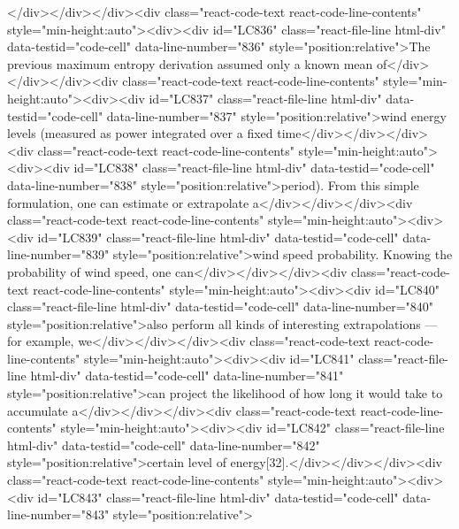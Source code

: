 {{{{{</div></div></div><div class="react-code-text react-code-line-contents" style="min-height:auto"><div><div id="LC836" class="react-file-line html-div" data-testid="code-cell" data-line-number="836" style="position:relative">The previous maximum entropy derivation assumed only a known mean of</div></div></div><div class="react-code-text react-code-line-contents" style="min-height:auto"><div><div id="LC837" class="react-file-line html-div" data-testid="code-cell" data-line-number="837" style="position:relative">wind energy levels (measured as power integrated over a fixed time</div></div></div><div class="react-code-text react-code-line-contents" style="min-height:auto"><div><div id="LC838" class="react-file-line html-div" data-testid="code-cell" data-line-number="838" style="position:relative">period). From this simple formulation, one can estimate or extrapolate a</div></div></div><div class="react-code-text react-code-line-contents" style="min-height:auto"><div><div id="LC839" class="react-file-line html-div" data-testid="code-cell" data-line-number="839" style="position:relative">wind speed probability. Knowing the probability of wind speed, one can</div></div></div><div class="react-code-text react-code-line-contents" style="min-height:auto"><div><div id="LC840" class="react-file-line html-div" data-testid="code-cell" data-line-number="840" style="position:relative">also perform all kinds of interesting extrapolations --- for example, we</div></div></div><div class="react-code-text react-code-line-contents" style="min-height:auto"><div><div id="LC841" class="react-file-line html-div" data-testid="code-cell" data-line-number="841" style="position:relative">can project the likelihood of how long it would take to accumulate a</div></div></div><div class="react-code-text react-code-line-contents" style="min-height:auto"><div><div id="LC842" class="react-file-line html-div" data-testid="code-cell" data-line-number="842" style="position:relative">certain level of energy{[}32{]}.</div></div></div><div class="react-code-text react-code-line-contents" style="min-height:auto"><div><div id="LC843" class="react-file-line html-div" data-testid="code-cell" data-line-number="843" style="position:relative">
}}}}}
